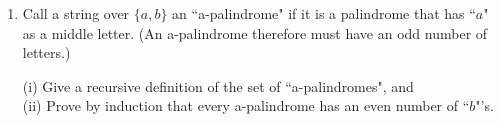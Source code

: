 \documentclass[12pt]{article}
\begin{document}
\begin{enumerate}
\item	Call a string over $\{a, b\}$
an ``a-palindrome" if it is a palindrome that has ``$a$" as a middle letter. (An a-palindrome therefore must have an odd number of letters.) 

(i) Give a recursive definition of the set of ``a-palindromes", and \\
(ii) Prove by induction that every a-palindrome has an even number of ``$b$"'s. \\

%
%
%
  
   



\end{enumerate}
\end{document}

